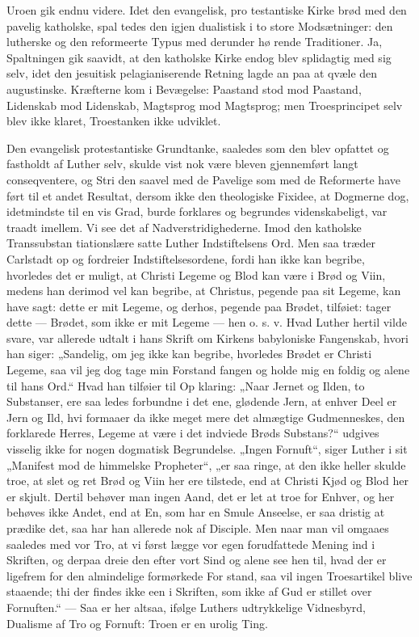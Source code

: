 \documentclass[12pt]{book}
\newcommand{\opage}[1]{\marginnote{\footnotesize\textit{[#1]}}}
\begin{document}
Uroen gik endnu videre. Idet den evangelisk, pro\-%
testantiske Kirke brød med den pavelig katholske, spal\-%
tedes den igjen dualistisk i to store Modsætninger: den
lutherske og den reformeerte Typus med derunder hø\-%
rende Traditioner. Ja, Spaltningen gik saavidt, at den
katholske Kirke endog blev splidagtig med sig selv, idet
den jesuitisk pelagianiserende Retning lagde an paa
at qvæle den augustinske. Kræfterne kom i Bevægelse:
Paastand stod mod Paastand, Lidenskab mod Lidenskab,
Magtsprog mod Magtsprog; men Troesprincipet selv blev
ikke klaret, Troestanken ikke udviklet.

Den evangelisk protestantiske Grundtanke, saaledes som
den blev opfattet og fastholdt af Luther selv, skulde vist\-%
nok være bleven gjennemført langt conseqventere, og Stri\-%
den saavel med de Pavelige som med de Reformerte have ført
til et andet Resultat, dersom ikke den theologiske Fixidee, at
Dogmerne dog, idetmindste til en vis Grad, burde forklares og
begrundes videnskabeligt, var traadt imellem. Vi see det af
Nadverstridighederne. Imod den katholske Transsubstan\-%
tiationslære satte Luther Indstiftelsens Ord. Men saa træder
Carlstadt op og fordreier Indstiftelsesordene, fordi han ikke
kan begribe, hvorledes det er muligt, at Christi Legeme og
Blod kan være i Brød og Viin, medens han derimod vel kan
begribe, at Christus, pegende paa sit Legeme, kan have
sagt: dette er mit Legeme, og derhos, pegende paa Brødet,
tilføiet: tager dette --- Brødet, som ikke er mit Legeme
--- hen o. s. v. Hvad Luther hertil vilde svare, var
allerede udtalt i hans Skrift om Kirkens babyloniske
Fangenskab, hvori han siger: „Sandelig, om jeg ikke
kan begribe, hvorledes Brødet er Christi Legeme, saa
vil jeg dog tage min Forstand fangen og holde mig en\-%
foldig og alene til hans Ord.“ Hvad han tilføier til Op\-%
\opage{266}\setcounter{footnote}{0}%
klaring: „Naar Jernet og Ilden, to Substanser, ere saa\-%
ledes forbundne i det ene, glødende Jern, at enhver Deel
er Jern og Ild, hvi formaaer da ikke meget mere det
almægtige Gudmenneskes, den forklarede Herres, Legeme
at være i det indviede Brøds Substans?“ udgives visselig
ikke for nogen dogmatisk Begrundelse. „Ingen Fornuft“,
siger Luther i sit „Manifest mod de himmelske Propheter“,
„er saa ringe, at den ikke heller skulde troe, at slet og
ret Brød og Viin her ere tilstede, end at Christi Kjød
og Blod her er skjult. Dertil behøver man ingen Aand,
det er let at troe for Enhver, og her behøves ikke Andet,
end at En, som har en Smule Anseelse, er saa dristig
at prædike det, saa har han allerede nok af Disciple.
Men naar man vil omgaaes saaledes med vor Tro, at vi
først lægge vor egen forudfattede Mening ind i Skriften,
og derpaa dreie den efter vort Sind og alene see hen til,
hvad der er ligefrem for den almindelige formørkede For\-%
stand, saa vil ingen Troesartikel blive staaende; thi der
findes ikke een i Skriften, som ikke af Gud er stillet
over Fornuften.“ --- Saa er her altsaa, ifølge Luthers
udtrykkelige Vidnesbyrd, Dualisme af Tro og Fornuft:
Troen er en urolig Ting.
\end{document}
